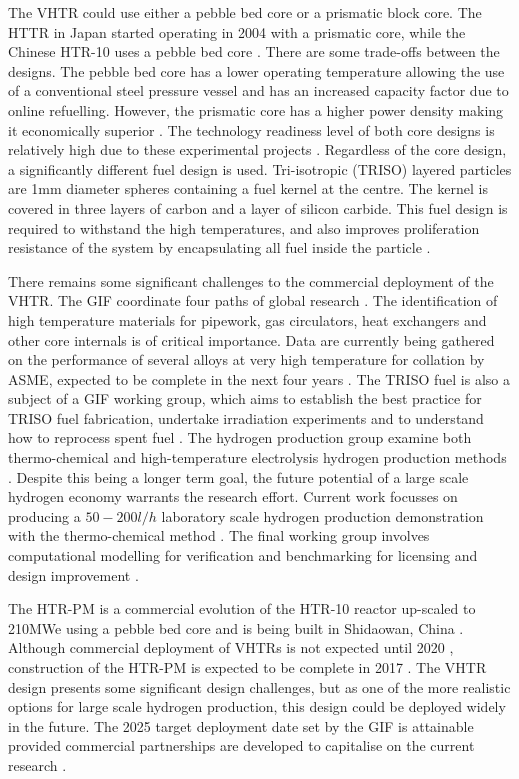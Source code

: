 \documentclass[journal]{IEEEtran}
\begin{document}
The VHTR could use either a pebble bed core or a prismatic block core.
The HTTR in Japan started operating in 2004 with a prismatic core, while the Chinese HTR-10 uses a pebble bed core \cite{Ftterer2014}.
There are some trade-offs between the designs.
The pebble bed core has a lower operating temperature allowing the use of a conventional steel pressure vessel and has an increased capacity factor due to online refuelling.
However, the prismatic core has a higher power density making it economically superior \cite{Locatelli2013}.
The technology readiness level of both core designs is relatively high due to these experimental projects \cite{Ftterer2014}.
Regardless of the core design, a significantly different fuel design is used.
Tri-isotropic (TRISO) layered particles are 1mm diameter spheres containing a fuel kernel at the centre.
The kernel is covered in three layers of carbon and a layer of silicon carbide.
This fuel design is required to withstand the high temperatures, and also improves proliferation resistance of the system by encapsulating all fuel inside the particle \cite{Marques2010a}.

There remains some significant challenges to the commercial deployment of the VHTR. 
The GIF coordinate four paths of global research \cite{GenIVForum}.
The identification of high temperature materials for pipework, gas circulators, heat exchangers and other core internals is of critical importance. 
Data are currently being gathered on the performance of several alloys at very high temperature for collation by ASME, expected to be complete in the next four years \cite{Ftterer2014}.
The TRISO fuel is also a subject of a GIF working group, which aims to establish the best practice for TRISO fuel fabrication, undertake irradiation experiments \cite{Ftterer2014} and to understand how to reprocess spent fuel \cite{GenIVForum}. 
The hydrogen production group examine both thermo-chemical and high-temperature electrolysis hydrogen production methods \cite{GenIVForum}.
Despite this being a longer term goal, the future potential of a large scale hydrogen economy warrants the research effort.
Current work focusses on producing a $50-200l/h$ laboratory scale hydrogen production demonstration with the thermo-chemical method \cite{Ftterer2014}.
The final working group involves computational modelling for verification and benchmarking for licensing and design improvement \cite{GenIVForum}.

The HTR-PM is a commercial evolution of the HTR-10 reactor up-scaled to 210MWe using a pebble bed core and is being built in Shidaowan, China \cite{Locatelli2013}.
Although commercial deployment of VHTRs is not expected until 2020 \cite{GenIVRoadmap}, construction of the HTR-PM is expected to be complete in 2017 \cite{Ftterer2014}. 
The VHTR design presents some significant design challenges, but as one of the more realistic options for large scale hydrogen production, this design could be deployed widely in the future.
The 2025 target deployment date set by the GIF \cite{GenIVRoadmap} is attainable provided commercial partnerships are developed to capitalise on the current research \cite{Ftterer2014}.
\end{document}
